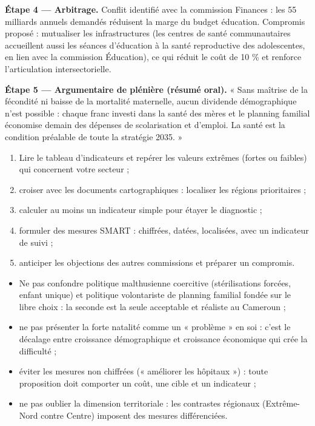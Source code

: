 \documentclass[11pt]{article}
\newcommand{\cle}[1]{{\popxbold\color{popdark}#1}}
\begin{document}
\begin{exoresolu}
\textbf{Étape 4 — Arbitrage.} Conflit identifié avec la commission Finances : les 55 milliards annuels demandés réduisent la marge du budget éducation. Compromis proposé : mutualiser les infrastructures (les centres de santé communautaires accueillent aussi les séances d'éducation à la santé reproductive des adolescentes, en lien avec la commission Éducation), ce qui réduit le coût de 10 \% et renforce l'articulation intersectorielle.

\textbf{Étape 5 — Argumentaire de plénière (résumé oral).} « Sans maîtrise de la fécondité ni baisse de la mortalité maternelle, aucun dividende démographique n'est possible : chaque franc investi dans la santé des mères et le planning familial économise demain des dépenses de scolarisation et d'emploi. La santé est la condition préalable de toute la stratégie 2035. »
\end{exoresolu}

\begin{methode}
\begin{enumerate}
\item Lire le tableau d'indicateurs et repérer les valeurs extrêmes (fortes ou faibles) qui concernent votre secteur ;
\item croiser avec les documents cartographiques : localiser les régions prioritaires ;
\item calculer au moins un indicateur simple pour étayer le diagnostic ;
\item formuler des mesures SMART : chiffrées, datées, localisées, avec un indicateur de suivi ;
\item anticiper les objections des autres commissions et préparer un compromis.
\end{enumerate}
\end{methode}

\begin{attention}
\begin{itemize}
\item Ne pas confondre \cle{politique malthusienne} coercitive (stérilisations forcées, enfant unique) et politique volontariste de planning familial fondée sur le libre choix : la seconde est la seule acceptable et réaliste au Cameroun ;
\item ne pas présenter la forte natalité comme un « problème » en soi : c'est le décalage entre croissance démographique et croissance économique qui crée la difficulté ;
\item éviter les mesures non chiffrées (« améliorer les hôpitaux ») : toute proposition doit comporter un coût, une cible et un indicateur ;
\item ne pas oublier la dimension territoriale : les contrastes régionaux (Extrême-Nord contre Centre) imposent des mesures différenciées.
\end{itemize}
\end{attention}
\end{document}

